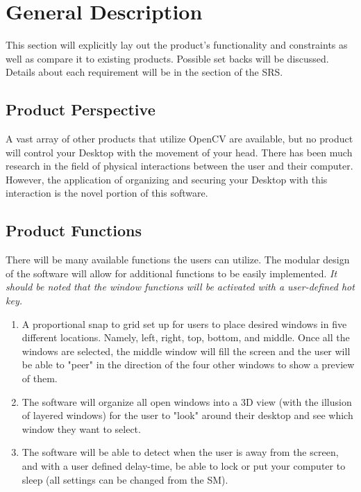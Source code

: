 \documentclass[titlepage]{article}
\begin{document}
\section{General Description}
This section will explicitly lay out the product's functionality and constraints as well as compare it to existing products. Possible set backs will be discussed. Details about each requirement will be in the  section of the SRS. 
 

\subsection{Product Perspective}
A vast array of other products that utilize OpenCV are available, but no product will control your Desktop with the movement of your head. There has been much research in the field of physical interactions between the user and their computer. However, the application of organizing and securing your Desktop with this interaction is the novel portion of this software.

\subsection{Product Functions}
There will be many available functions the users can utilize. The modular design of the software will allow for additional functions to be easily implemented. \textit{It should be noted that the window functions will be activated with a user-defined hot key.}
\begin{enumerate}
	\item A proportional snap to grid set up for users to place desired windows in five different locations. Namely, left, right, top, bottom, and middle. Once all the windows are selected, the middle window will fill the screen and the user will be able to "peer" in the direction of the four other windows to show a preview of them. 
	\item The software will organize all open windows into a 3D view (with the illusion of layered windows) for the user to "look" around their desktop and see which window they want to select.
	\item The software will be able to detect when the user is away from the screen, and with a user defined delay-time, be able to lock or put your computer to sleep (all settings can be changed from the SM).
\end{enumerate}
\end{document}

